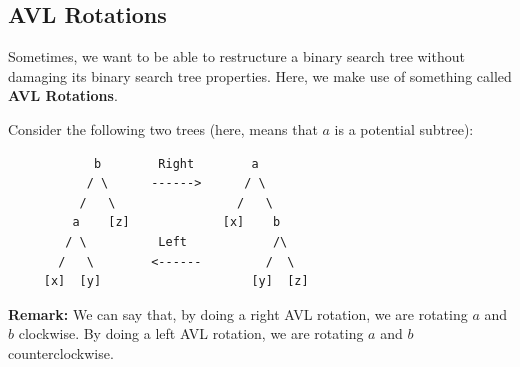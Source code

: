 \documentclass[letterpaper]{article}
\begin{document}
\subsection{AVL Rotations}
Sometimes, we want to be able to restructure a binary search tree without damaging its binary search tree properties. Here, we make use of something called \textbf{AVL Rotations}.

\bigskip 

Consider the following two trees (here, \code{[a]} means that $a$ is a potential subtree): 
\begin{verbatim}
            b        Right        a
           / \      ------>      / \ 
          /   \                 /   \ 
         a    [z]             [x]    b
        / \          Left            /\
       /   \        <------         /  \
     [x]  [y]                     [y]  [z]
\end{verbatim}
\textbf{Remark:} We can say that, by doing a right AVL rotation, we are rotating $a$ and $b$ clockwise. By doing a left AVL rotation, we are rotating $a$ and $b$ counterclockwise. 

\bigskip 
\end{document}
